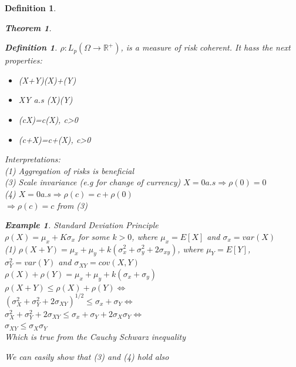 \documentclass[11pt,a4paper,oneside]{article}\usepackage[]{graphicx}\usepackage[]{color}
\makeatletter
\newenvironment{kframe}{%
 \def\at@end@of@kframe{}%
 \ifinner\ifhmode%
  \def\at@end@of@kframe{\end{minipage}}%
  \begin{minipage}{\columnwidth}%
 \fi\fi%
 \def\FrameCommand##1{\hskip\@totalleftmargin \hskip-\fboxsep
 \colorbox{shadecolor}{##1}\hskip-\fboxsep
     \hskip-\linewidth \hskip-\@totalleftmargin \hskip\columnwidth}%
 \MakeFramed {\advance\hsize-\width
   \@totalleftmargin\z@ \linewidth\hsize
   \@setminipage}}%
 {\par\unskip\endMakeFramed%
 \at@end@of@kframe}
\newenvironment{knitrout}{}{} %
\newtheorem{thm}{Theorem}[subsection]
\newtheorem{defi}[subsection]{Definition}
\newtheorem{exm}{Example}
\makeatother
\begin{document}
\begin{algin*}
\begin{defi}
\begin{thm}
\begin{defi}
$\rho:L_p(\Omega\rightarrow\mathbb{R}^+)$, is a measure of risk coherent. It hass the next properties:
\begin{itemize}
\item \rho(X+Y)\leq \rho(X)+\rho(Y)
\item X\leq Y a.s \Rightarrow \rho(X)\leq \rho(Y)
\item \rho(cX)=c\rho(X), \forall c>0
\item \rho(c+X)=c+\rho(X), \forall c>0
\end{itemize}
\end{defi}
Interpretations:\\
(1) Aggregation of risks is beneficial\\
(3) Scale invariance (e.g for change of currency) $X=0 a.s \Rightarrow \rho(0)=0$ \\
(4) $X=0 a.s\Rightarrow \rho(c)=c+\rho(0)$\\
                        $\Rightarrow \rho(c)=c $ from (3)\\
                        
\begin{exm} Standard Deviation Principle\\
$\rho(X)=\mu_x+K\sigma_x$ for some $k>0$, where $\mu_x=E[X]$ and $\sigma_x=var(X)$\\
(1) $\rho(X+Y)=\mu_x+\mu_y+k(\sigma^2_x+\sigma^2_y+2\sigma_{xy})$, where $\mu_Y=E[Y]$, $\sigma^2_Y=var(Y)$ and $\sigma_{XY}=cov(X,Y)$\\

$\rho(X)+\rho(Y)=\mu_x+\mu_y+k(\sigma_x+\sigma_y)$\\
$\rho(X+Y)\leq \rho(X)+\rho(Y)\Leftrightarrow$\\
$(\sigma^2_X+\sigma^2_Y+2\sigma_{XY})^{1/2}\leq \sigma_x+\sigma_Y\Leftrightarrow$\\
$\sigma^2_X+\sigma^2_Y+2\sigma_{XY}\leq \sigma_x+\sigma_Y+2\sigma_X\sigma_Y\Leftrightarrow$\\
$\sigma_{XY}\leq \sigma_X\sigma_Y$\\
Which is true from the Cauchy Schwarz inequality

We  can easily show that (3) and (4) hold also 
\begin{knitrout}
\color{fgcolor}\begin{kframe}


{\ttfamily\noindent\bfseries\color{errorcolor}{\#\# Error in xy.coords(x, y): 'x' and 'y' lengths differ}}\end{kframe}


\end{knitrout}
\end{exm}
\end{thm}
\end{defi}
\end{algin*}
\end{document}
